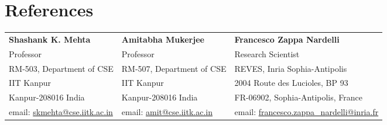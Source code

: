 \documentclass[a4paper,10pt]{article}
\begin{document}
\section{References}
\begin{tabular}{p{5cm}|p{5cm}|p{6cm}}
\textbf{Shashank K. Mehta} & \textbf{Amitabha Mukerjee} & \textbf{Francesco Zappa Nardelli}\\
{\small Professor} & {\small Professor} & {\small Research Scientist}\\
{\small RM-503, Department of CSE} & {\small RM-507, Department of CSE} & {\small REVES, Inria Sophia-Antipolis}\\
{\small IIT Kanpur} & {\small IIT Kanpur} & {\small 2004 Route des Lucioles, BP 93}\\
{\small Kanpur-208016 India} & {\small Kanpur-208016 India} & {\small FR-06902, Sophia-Antipolis, France}\\
{\small email: \href{mailto:skmehta@cse.iitk.ac.in}{skmehta@cse.iitk.ac.in}} &
{\small email: \href{mailto:amit@cse.iitk.ac.in}{amit@cse.iitk.ac.in}} &
{\small email: \href{mailto:francesco.zappa_nardelli@inria.fr}{francesco.zappa\_nardelli@inria.fr}}
\end{tabular}
\end{document}
